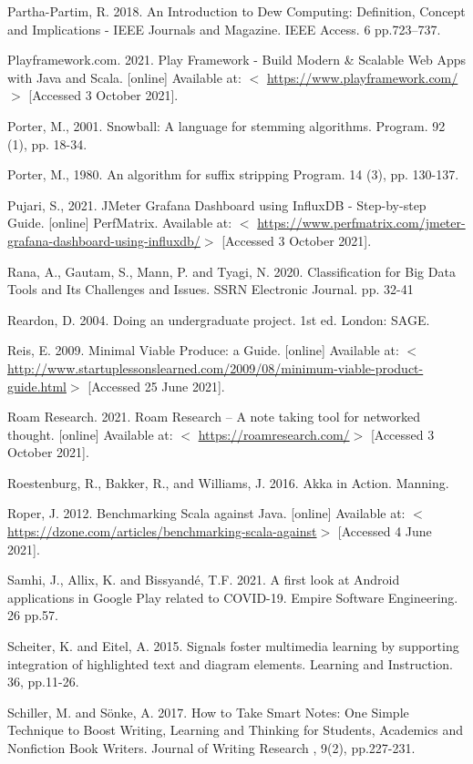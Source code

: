 \documentclass{article}
\begin{document}
{Partha-Partim, R. 2018. An Introduction to Dew Computing: Definition, Concept and Implications - IEEE Journals and Magazine. IEEE Access. 6 pp.723–737. 

Playframework.com. 2021. Play Framework - Build Modern & Scalable Web Apps with Java and Scala. [online] Available at: $<$ \url{https://www.playframework.com/}$>$ [Accessed 3 October 2021].

Porter, M., 2001. Snowball: A language for stemming algorithms. Program. 92 (1), pp. 18-34.

Porter, M., 1980. An algorithm for suffix stripping Program. 14 (3), pp. 130-137.

Pujari, S., 2021. JMeter Grafana Dashboard using InfluxDB - Step-by-step Guide. [online] PerfMatrix. Available at: $<$ \url{https://www.perfmatrix.com/jmeter-grafana-dashboard-using-influxdb/}$>$ [Accessed 3 October 2021].

Rana, A., Gautam, S., Mann, P. and Tyagi, N. 2020. Classification for Big Data Tools and Its Challenges and Issues. SSRN Electronic Journal. pp. 32-41

Reardon, D. 2004. Doing an undergraduate project. 1st ed. London: SAGE.

Reis, E. 2009. Minimal Viable Produce: a Guide. [online] Available at:  $<$ {\url{http://www.startuplessonslearned.com/2009/08/minimum-viable-product-guide.html}}$>$ [Accessed 25 June 2021].

Roam Research. 2021. Roam Research – A note taking tool for networked thought. [online] Available at: $<$ \url{https://roamresearch.com/}$>$ [Accessed 3 October 2021].

Roestenburg, R., Bakker, R., and Williams, J. 2016. Akka in Action. Manning.

Roper, J. 2012. Benchmarking Scala against Java. [online] Available at:  $<$ \url{https://dzone.com/articles/benchmarking-scala-against}$>$ [Accessed 4 June 2021].

Samhi, J., Allix, K. and Bissyandé, T.F. 2021. A first look at Android applications in Google Play related to COVID-19. Empire Software Engineering. 26 pp.57.

Scheiter, K. and Eitel, A. 2015. Signals foster multimedia learning by supporting integration of highlighted text and diagram elements. Learning and Instruction. 36, pp.11-26.

Schiller, M. and Sönke, A. 2017. How to Take Smart Notes: One Simple Technique to Boost Writing, Learning and Thinking for Students, Academics and Nonfiction Book Writers. Journal of Writing Research , 9(2), pp.227-231.

}
\end{document}

